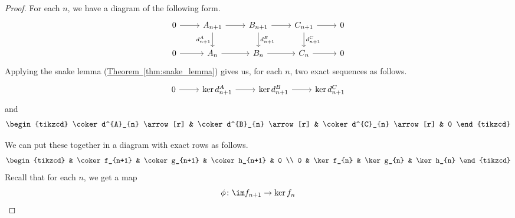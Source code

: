 \documentclass[main.tex]{subfiles}
\begin{document}
\begin{proof}
  For each $n$, we have a diagram of the following form.
  \begin{equation*}
    \begin{tikzcd}
      0
      \arrow[r]
      & A_{n+1}
      \arrow[r]
      \arrow[d, swap, "d^{A}_{n+1}"]
      & B_{n+1}
      \arrow[r]
      \arrow[d, "d^{B}_{n+1}"]
      & C_{n+1}
      \arrow[r]
      \arrow[d, "d^{C}_{n+1}"]
      & 0
      \\
      0
      \arrow[r]
      & A_{n}
      \arrow[r]
      & B_{n}
      \arrow[r]
      & C_{n}
      \arrow[r]
      & 0
    \end{tikzcd}
  \end{equation*}
  Applying the snake lemma (\hyperref[thm:snake_lemma]{Theorem~\ref*{thm:snake_lemma}}) gives us, for each $n$, two exact sequences as follows.
  \begin{equation*}
    \begin{tikzcd}
      0
      \arrow[r]
      & \ker d^{A}_{n+1}
      \arrow[r]
      & \ker d^{B}_{n+1}
      \arrow[r]
      & \ker d^{C}_{n+1}
    \end{tikzcd}
  \end{equation*}
  and
  \begin{equation*}
    \begin{tikzcd}
      \coker d^{A}_{n}
      \arrow[r]
      & \coker d^{B}_{n}
      \arrow[r]
      & \coker d^{C}_{n}
      \arrow[r]
      & 0
    \end{tikzcd}
  \end{equation*}

  We can put these together in a diagram with exact rows as follows.
  \begin{equation*}
    \begin{tikzcd}
      & \coker f_{n+1}
      & \coker g_{n+1}
      & \coker h_{n+1}
      & 0
      \\
      0
      & \ker f_{n}
      & \ker g_{n}
      & \ker h_{n}
    \end{tikzcd}
  \end{equation*}
  Recall that for each $n$, we get a map
  \begin{equation*}
    \phi\colon \im f_{n+1} \to \ker f_{n}
  \end{equation*}
\end{proof}
\end{document}
